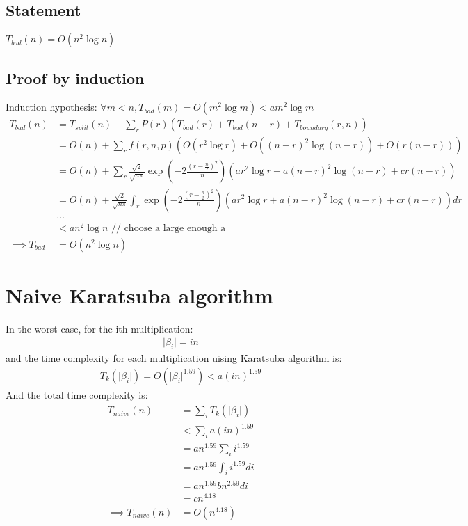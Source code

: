 \documentclass{article}
\begin{document}
\subsection{Statement}
$T_{bad}(n) = O(n^2 \log n)$
\subsection{Proof by induction}
Induction hypothesis: $\forall m < n, T_{bad}(m) = O(m^2 \log m) < am^2 \log m$
\begin{align*}
T_{bad}(n)
&= T_{split}(n) + \sum_r P(r) (T_{bad}(r) + T_{bad}(n-r) + T_{boundary}(r, n))\\
&= O(n) + \sum_r f(r, n, p) (O(r^2 \log r) + O((n-r)^2 \log (n-r)) +
O(r(n-r)))\\
&= O(n) + \sum_r \frac{\sqrt{2}}{\sqrt{n\pi}}
\exp(-2\frac{(r-\frac{n}{2})^2}{n})(ar^2 \log r + a(n-r)^2 \log (n-r) + cr(n-r))\\
&= O(n) + \frac{\sqrt{2}}{\sqrt{n\pi}} \int_r
\exp(-2\frac{(r-\frac{n}{2})^2}{n})(ar^2 \log r + a(n-r)^2 \log (n-r) + cr(n-r)) dr\\
&\ldots\\
&< an^2 \log n \text{ // choose a large enough a} \\
\implies T_{bad} &= O(n^2 \log n)
\end{align*}
\section{Naive Karatsuba algorithm}
In the worst case, for the ith multiplication:
\begin{align*}
\vert \beta_i \vert = in
\end{align*}
and the time complexity for each multiplication uising Karatsuba algorithm is:
\begin{align*}
T_k(\vert \beta_i \vert) = O(\vert \beta_i \vert^{1.59}) < a (in)^{1.59}
\end{align*}
And the total time complexity is:
\begin{align*}
T_{naive}(n)
&= \sum_i T_k(\vert \beta_i \vert)\\
&< \sum_i a (in)^{1.59}\\
&= a n^{1.59} \sum_i  i^{1.59}\\
&= a n^{1.59} \int_i  i^{1.59} di\\
&= a n^{1.59} b n^{2.59} di\\
&= c n^{4.18}\\
\implies T_{naive}(n) &= O(n^{4.18})
\end{align*}
\end{document}
